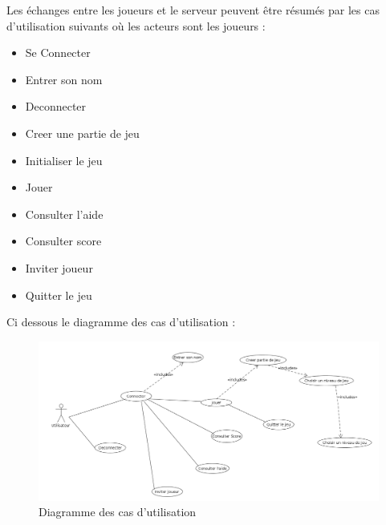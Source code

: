 \par
Les échanges entre les joueurs et le serveur peuvent être résumés par les cas d'utilisation suivants où les acteurs sont les joueurs : 

\begin{itemize}

	\item Se Connecter
	\item Entrer son nom
	\item Deconnecter
	\item Creer une partie de jeu
	\item Initialiser le jeu
	\item Jouer
	\item Consulter l'aide
	\item Consulter score
	\item Inviter joueur
	\item Quitter le jeu

\end{itemize}

Ci dessous le diagramme des cas d'utilisation : \\

\begin{figure}[ht]
	\centering
	\includegraphics[scale = 0.40]{img/useCase.png}
	\caption{Diagramme des cas d'utilisation}
\end{figure}
